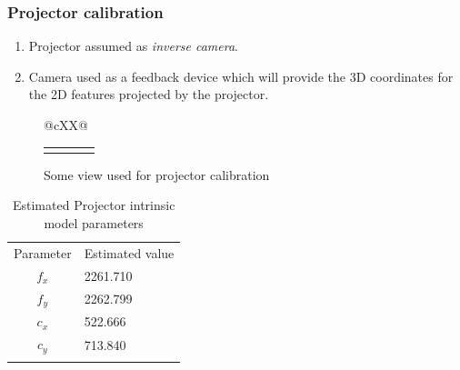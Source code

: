 \documentclass[9pt]{beamer}
\begin{document}
\begin{frame}
\frametitle{Projector calibration}
\begin{enumerate}
\item Projector assumed as \textit{inverse camera}.
\item Camera used as a feedback device which will provide the 3D coordinates for the 2D features projected by the projector.
\end{enumerate}
\begin{figure}[h!]  
\begin{tabularx}{\linewidth}{@{}cXX@{}}  
\begin{tabular}{c c c c}   
\hspace{-0.3cm}\subfloat[]{\texttt{[image: ../Thesis\_work/Latex\_thesis\_work/img\_source/proj\_view\_1.png]}} &  
\hspace{-0.3cm}\subfloat[]{\texttt{[image: ../Thesis\_work/Latex\_thesis\_work/img\_source/proj\_view\_2.png]}} &  
\hspace{-0.3cm}\subfloat[]{\texttt{[image: ../Thesis\_work/Latex\_thesis\_work/img\_source/proj\_view\_3.png]}} &  
\hspace{-0.3cm}\subfloat[]{\texttt{[image: ../Thesis\_work/Latex\_thesis\_work/img\_source/proj\_view\_4.png]}} \\  
\end{tabular}  
\end{tabularx}  
\caption{Some view used for projector calibration} 
\label{fig:proj_calib_view} 
\end{figure} 
\vspace{-0.6cm}
\begin{table}[h]  
\centering  
\begin{tabular}{c l}  
\hline\noalign{\smallskip}  
Parameter & Estimated value \\  
\noalign{\smallskip}\hline\noalign{\smallskip}  
$f_x$ & 2261.710\\  
$f_y$ & 2262.799\\  
$c_x$ & 522.666\\  
$c_y$ & 713.840\\  
\noalign{\smallskip}\hline  
\end{tabular}  
\caption{Estimated Projector intrinsic model parameters}  
\end{table}  
\end{frame}
\end{document}
